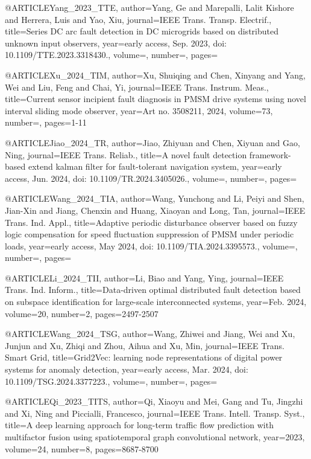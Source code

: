 @ARTICLE{Yang_2023_TTE,
  author={Yang, Ge and Marepalli, Lalit Kishore and Herrera, Luis and Yao, Xiu},
  journal={IEEE Trans. Transp. Electrif.}, 
  title={Series DC arc fault detection in DC microgrids based on distributed unknown input observers}, 
  year={early access, Sep. 2023, doi: 10.1109/TTE.2023.3318430.},
  volume={},
  number={},
  pages={}}


@ARTICLE{Xu_2024_TIM,
  author={Xu, Shuiqing and Chen, Xinyang and Yang, Wei and Liu, Feng and Chai, Yi},
  journal={IEEE Trans. Instrum. Meas.}, 
  title={Current sensor incipient fault diagnosis in PMSM drive systems using novel interval sliding mode observer}, 
  year={Art no. 3508211, 2024},
  volume={73},
  number={},
  pages={1-11}}

@ARTICLE{Jiao_2024_TR,
  author={Jiao, Zhiyuan and Chen, Xiyuan and Gao, Ning},
  journal={IEEE Trans. Reliab.}, 
  title={A novel fault detection framework-based extend kalman filter for fault-tolerant navigation system}, 
  year={early access, Jun. 2024, doi: 10.1109/TR.2024.3405026.},
  volume={},
  number={},
  pages={}}


@ARTICLE{Wang_2024_TIA,
  author={Wang, Yunchong and Li, Peiyi and Shen, Jian-Xin and Jiang, Chenxin and Huang, Xiaoyan and Long, Tan},
  journal={IEEE Trans. Ind. Appl.}, 
  title={Adaptive periodic disturbance observer based on fuzzy logic compensation for speed fluctuation suppression of PMSM under periodic loads}, 
  year={early access, May 2024, doi: 10.1109/TIA.2024.3395573.},
  volume={},
  number={},
  pages={}}


@ARTICLE{Li_2024_TII,
  author={Li, Biao and Yang, Ying},
  journal={IEEE Trans. Ind. Inform.}, 
  title={Data-driven optimal distributed fault detection based on subspace identification for large-scale interconnected systems}, 
  year={Feb. 2024},
  volume={20},
  number={2},
  pages={2497-2507}}


@ARTICLE{Wang_2024_TSG,
  author={Wang, Zhiwei and Jiang, Wei and Xu, Junjun and Xu, Zhiqi and Zhou, Aihua and Xu, Min},
  journal={IEEE Trans. Smart Grid}, 
  title={Grid2Vec: learning node representations of digital power systems for anomaly detection}, 
  year={early access, Mar. 2024, doi: 10.1109/TSG.2024.3377223.},
  volume={},
  number={},
  pages={}}



@ARTICLE{Qi_2023_TITS,
  author={Qi, Xiaoyu and Mei, Gang and Tu, Jingzhi and Xi, Ning and Piccialli, Francesco},
  journal={IEEE Trans. Intell. Transp. Syst.}, 
  title={A deep learning approach for long-term traffic flow prediction with multifactor fusion using spatiotemporal graph convolutional network}, 
  year={2023},
  volume={24},
  number={8},
  pages={8687-8700}}


